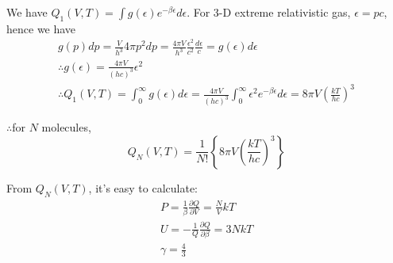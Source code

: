 \documentclass{article}
\begin{document}
	We have $Q_1(V,T)=\int g(\epsilon) e^{-\beta \epsilon}d \epsilon $. For 3-D extreme relativistic gas, $\epsilon =pc $, hence we have
	\begin{gather*}
		g(p)dp=\frac{V}{h^3}4 \pi p^2dp = \frac{4 \pi V }{h^3} \frac{\epsilon^2}{c^2} \frac{d \epsilon}{c} = g(\epsilon)d \epsilon\\
		\therefore g(\epsilon)=\frac{4 \pi V}{(hc)^3} \epsilon^2\\
		\therefore Q_1(V,T)=\int^{\infty}_0 g(\epsilon)d \epsilon=\frac{4 \pi V}{(hc)^3} \int^{\infty}_0 \epsilon^2 e^{-\beta \epsilon}d \epsilon = 8 \pi V \left( \frac{kT}{hc} \right)^3
	\end{gather*}
	
	$\therefore$for $N$ molecules,
	\begin{equation*}
		Q_N(V,T)= \frac{1}{N!}\left\{ 8 \pi V \left( \frac{kT}{hc} \right)^3\right\}
	\end{equation*}

	From $Q_N(V,T)$, it's easy to calculate:
	\begin{gather*}
		P=\frac{1}{\beta} \frac{\partial Q}{\partial V} = \frac{N}{V}kT\\
		U = -\frac{1}{Q} \frac{\partial Q}{\partial \beta}=3NkT\\
		\gamma = \frac{4}{3}
	\end{gather*}

\end{document}
